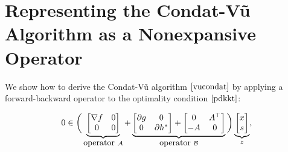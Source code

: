 \section{Representing the Condat-V\~{u} Algorithm as a Nonexpansive Operator}\label{sec:vc-op}
We show how to derive the Condat-V\~{u} algorithm $\eqref{vucondat}$ by applying a forward-backward operator to the optimality condition $\eqref{pdkkt}$:

\begin{equation}
0\in\bigg(\underbrace{\begin{bmatrix}
\nabla f & 0\\
0 & 0
\end{bmatrix}}_{\mbox{operator}~\cA}+\underbrace{
\begin{bmatrix}
\partial g & 0 \\
0 & \partial h^*
\end{bmatrix}+\begin{bmatrix}
0&A^\top\\
-A&0
\end{bmatrix}}_{\mbox{operator}~\cB}\bigg) \underbrace{\begin{bmatrix}
x\\
s
\end{bmatrix}}_{z},
\end{equation}

